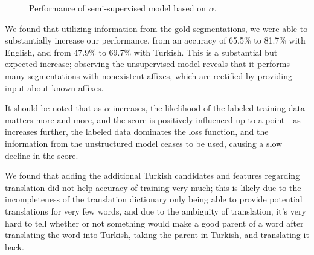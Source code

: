 \documentclass[11pt,twocolumn]{article}
\begin{document}
\begin{figure}
    \label{fig:supervised}
    \caption{Performance of semi-supervised model based on $\alpha$.}
\end{figure}

We found that utilizing information from the gold segmentations, we were able to substantially increase our
performance, from an accuracy of 65.5\% to 81.7\% with English, and from 47.9\% to 69.7\% with Turkish.
This is a substantial but expected increase; observing the unsupervised model reveals that it performs
many segmentations with nonexistent affixes, which are rectified by providing input about known affixes.

It should be noted that as $\alpha$ increases, the likelihood of the labeled training data matters more and more,
and the score is positively influenced up to a point---as \alpha increases further, the labeled data
dominates the loss function, and the information from the unstructured model ceases to be used,
causing a slow decline in the score.

We found that adding the additional Turkish candidates and features regarding translation
did not help accuracy of training very much; this is likely due to the incompleteness of the translation
dictionary only being able to provide potential translations for very few words, and due to the ambiguity
of translation, it's very hard to tell whether or not something would make a good parent of a word after
translating the word into Turkish, taking the parent in Turkish, and translating it back.


\end{document}
